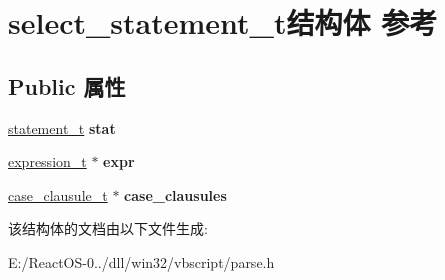 \hypertarget{structselect__statement__t}{}\section{select\+\_\+statement\+\_\+t结构体 参考}
\label{structselect__statement__t}
\subsection*{Public 属性}
\begin{DoxyCompactItemize}
\item 
\mbox{\label{structselect__statement__t_ae4e3b781db6c78215c68716f68727f4d}} 
\hyperlink{struct__statement__t}{statement\+\_\+t} {\bfseries stat}
\item 
\mbox{\label{structselect__statement__t_ac5033c439f6e789e731a1b4b03b6f398}} 
\hyperlink{struct__expression__t}{expression\+\_\+t} $\ast$ {\bfseries expr}
\item 
\mbox{\label{structselect__statement__t_a19c94c7d9f1439ca080fb9ca6f1a50ee}} 
\hyperlink{struct__case__clausule__t}{case\+\_\+clausule\+\_\+t} $\ast$ {\bfseries case\+\_\+clausules}
\end{DoxyCompactItemize}


该结构体的文档由以下文件生成\+:\begin{DoxyCompactItemize}
\item 
E\+:/\+React\+O\+S-\/0../dll/win32/vbscript/parse.\+h\end{DoxyCompactItemize}
